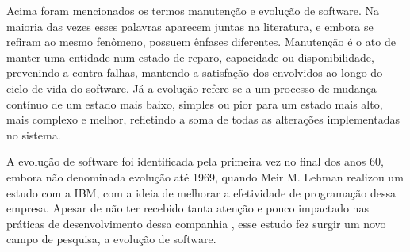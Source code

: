 Acima foram mencionados os termos manutenção e evolução de software. Na maioria das vezes esses palavras aparecem juntas na literatura, e embora se refiram ao mesmo fenômeno, possuem ênfases diferentes. Manutenção é o ato de manter uma entidade num estado de reparo, capacidade ou disponibilidade, prevenindo-a contra falhas, mantendo a satisfação dos envolvidos ao longo do ciclo de vida do software. Já a evolução refere-se a um processo de mudança contínuo de um estado mais baixo, simples ou pior para um estado mais alto, mais complexo e melhor, refletindo a soma de todas as alterações implementadas no sistema.

A evolução de software foi identificada pela primeira vez no final dos anos 60, embora não denominada evolução até 1969, quando Meir M. Lehman realizou um estudo com a IBM, com a ideia de melhorar a efetividade de programação dessa empresa. Apesar de não ter recebido tanta atenção e pouco impactado nas práticas de desenvolvimento dessa companhia , esse estudo fez surgir um novo campo de pesquisa, a evolução de software.

